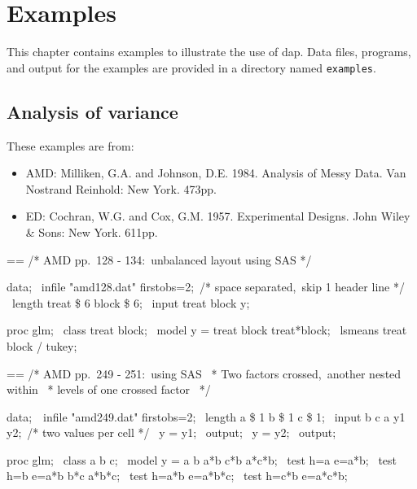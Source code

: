 \documentclass{book}
\makeatletter
\newenvironment{Texinfopreformatted}{%
  \par\GNUTobeylines\obeyspaces\frenchspacing\parskip=\z@\parindent=\z@}{}
{\catcode`\^^M=13 \gdef\GNUTobeylines{\catcode`\^^M=13 \def^^M{\null\par}}}
\newenvironment{Texinfoindented}{\begin{list}{}{}\item\relax}{\end{list}}
\renewcommand{\_}{\Texinfounderscore\discretionary{}{}{}}
\makeatother
\begin{document}
\chapter{{Examples}}
\label{anchor:Examples}%

This chapter contains examples to illustrate the use
of dap. Data files, programs, and output for the examples
are provided in a directory named \texttt{examples}.


\section{{Analysis of variance}}
\label{anchor:Analysis-of-variance-examples}%
%
%

These examples are from:

\begin{itemize}
\item AMD: Milliken, G.A. and Johnson, D.E. 1984.
Analysis of Messy Data.  Van Nostrand Reinhold: New York. 473pp.

\item ED: Cochran, W.G. and Cox, G.M. 1957.
Experimental Designs.  John Wiley \& Sons: New York. 611pp.

\end{itemize}

\begin{Texinfoindented}
\begin{Texinfopreformatted}%
\ttfamily 
/* AMD pp.\ 128 - 134:\ unbalanced layout using SAS  */

data;
\ infile "amd128.dat" firstobs=2;\ /* space separated,\ skip 1 header line */
\ length treat \$ 6 block \$ 6;
\ input treat block y;

proc glm;
\ class treat block;
\ model y = treat block treat*block;
\ lsmeans treat block / tukey;

\end{Texinfopreformatted}
\end{Texinfoindented}

\begin{Texinfoindented}
\begin{Texinfopreformatted}%
\ttfamily /* AMD pp.\ 249 - 251:\ using SAS
\ * Two factors crossed,\ another nested within
\ * levels of one crossed factor
\ */

data;\ 
\ infile "amd249.dat" firstobs=2;
\ length a \$ 1 b \$ 1 c \$ 1;
\ input b c a y1 y2;\ /* two values per cell */
\ y = y1;
\ output;
\ y = y2;
\ output;

proc glm;
\ class a b c;
\ model y = a b a*b c*b a*c*b;
\ test h=a e=a*b;
\ test h=b e=a*b b*c a*b*c;
\ test h=a*b e=a*b*c;
\ test h=c*b e=a*c*b;

\end{Texinfopreformatted}
\end{Texinfoindented}
\end{document}
